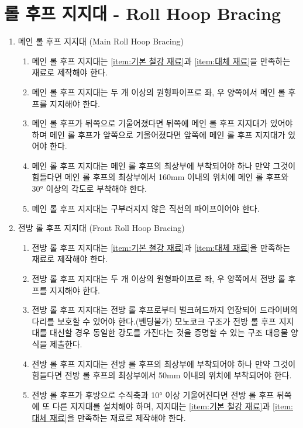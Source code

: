 \documentclass[final,a4paper,10pt]{report}
\begin{document}
\section{롤 후프 지지대 - Roll Hoop Bracing}
\begin{enumerate}
  \item 메인 롤 후프 지지대 (Main Roll Hoop Bracing) \label{item:메인 롤 후프 지지대}
    \begin{enumerate}
      \item 메인 롤 후프 지지대는 \cref{item:기본 철강 재료}과 \cref{item:대체 재료}을 만족하는 재료로 제작해야 한다.
      \item 메인 롤 후프 지지대는 두 개 이상의 원형파이프로 좌, 우 양쪽에서 메인 롤 후프를 지지해야 한다.
      \item 메인 롤 후프가 뒤쪽으로 기울어졌다면 뒤쪽에 메인 롤 후프 지지대가 있어야 하며 메인 롤 후프가 앞쪽으로 기울어졌다면 앞쪽에 메인 롤 후프 지지대가 있어야 한다.
      \item 메인 롤 후프 지지대는 메인 롤 후프의 최상부에 부착되어야 하나 만약 그것이 힘들다면 메인 롤 후프의 최상부에서 160mm 이내의 위치에 메인 롤 후프와 30° 이상의 각도로 부착해야 한다.
      \item 메인 롤 후프 지지대는 구부러지지 않은 직선의 파이프이어야 한다.
    \end{enumerate}
    
  \item 전방 롤 후프 지지대 (Front Roll Hoop Bracing) \label{item:전방 롤 후프 지지대}
    \begin{enumerate}
      \item 전방 롤 후프 지지대는 \cref{item:기본 철강 재료}과 \cref{item:대체 재료}을 만족하는 재료로 제작해야 한다.
      \item 전방 롤 후프 지지대는 두 개 이상의 원형파이프로 좌, 우 양쪽에서 전방 롤 후프를 지지해야 한다.
      \item 전방 롤 후프 지지대는 전방 롤 후프로부터 벌크헤드까지 연장되어 드라이버의 다리를 보호할 수 있어야 한다.(벤딩불가) 모노코크 구조가 전방 롤 후프 지지대를 대신할 경우 동일한 강도를 가진다는 것을 증명할 수 있는 구조 대응물 양식을 제출한다.
      \item 전방 롤 후프 지지대는 전방 롤 후프의 최상부에 부착되어야 하나 만약 그것이 힘들다면 전방 롤 후프의 최상부에서 50mm 이내의 위치에 부착되어야 한다.
      \item 전방 롤 후프가 후방으로 수직축과 10° 이상 기울어진다면 전방 롤 후프 뒤쪽에 또 다른 지지대를 설치해야 하며, 지지대는 \cref{item:기본 철강 재료}과 \cref{item:대체 재료}을 만족하는 재료로 제작해야 한다.
    \end{enumerate}
    

\end{enumerate}
\end{document}
